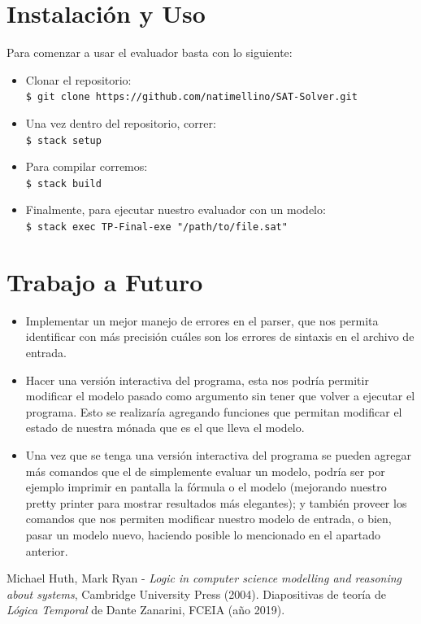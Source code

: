 \documentclass[11pt]{article}
\begin{document}
\section{Instalación y Uso}

Para comenzar a usar el evaluador basta con lo siguiente:

\begin{itemize}
  \item Clonar el repositorio: \\
        \texttt{\$ git clone https://github.com/natimellino/SAT-Solver.git}
  \item Una vez dentro del repositorio, correr: \\
        \texttt{\$ stack setup}
  \item Para compilar corremos: \\
        \texttt{\$ stack build}
  \item Finalmente, para ejecutar nuestro evaluador con un modelo: \\
        \texttt{\$ stack exec TP-Final-exe "/path/to/file.sat"}
\end{itemize}

\section{Trabajo a Futuro}

\begin{itemize}
  \item Implementar un mejor manejo de errores en el parser, que nos permita 
  identificar con más precisión cuáles son los errores de sintaxis en el archivo
  de entrada.
  \item Hacer una versión interactiva del programa, esta nos podría permitir
  modificar el modelo pasado como argumento sin tener que volver a ejecutar el
  programa. Esto se realizaría agregando funciones que permitan modificar el 
  estado de nuestra mónada que es el que lleva el modelo.
  \item Una vez que se tenga una versión interactiva del programa se pueden
  agregar más comandos que el de simplemente evaluar un modelo, podría ser por
  ejemplo imprimir en pantalla la fórmula o el modelo (mejorando nuestro pretty
  printer para mostrar resultados más elegantes); y también proveer los comandos
  que nos permiten modificar nuestro modelo de entrada, o bien, pasar un modelo nuevo,
  haciendo posible lo mencionado en el apartado anterior.
\end{itemize}

\newpage

\begin{thebibliography}{9}
  Michael Huth, Mark Ryan - \emph{Logic in computer science modelling and reasoning 
  about systems}, Cambridge University Press (2004).
  Diapositivas de teoría de \emph{Lógica Temporal} de Dante Zanarini, FCEIA (año 2019).
\end{thebibliography}
\end{document}
